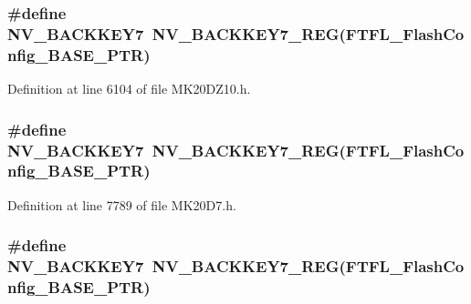 \subsubsection[{\texorpdfstring{N\+V\+\_\+\+B\+A\+C\+K\+K\+E\+Y7}{NV_BACKKEY7}}]{\setlength{\rightskip}{0pt plus 5cm}\#define N\+V\+\_\+\+B\+A\+C\+K\+K\+E\+Y7~{\bf N\+V\+\_\+\+B\+A\+C\+K\+K\+E\+Y7\+\_\+\+R\+EG}({\bf F\+T\+F\+L\+\_\+\+Flash\+Config\+\_\+\+B\+A\+S\+E\+\_\+\+P\+TR})}\hypertarget{group___n_v___register___accessor___macros_gaf4c4eb8173a514a0fe632f29e80423d4}{}\label{group___n_v___register___accessor___macros_gaf4c4eb8173a514a0fe632f29e80423d4}


Definition at line 6104 of file M\+K20\+D\+Z10.\+h.

\subsubsection[{\texorpdfstring{N\+V\+\_\+\+B\+A\+C\+K\+K\+E\+Y7}{NV_BACKKEY7}}]{\setlength{\rightskip}{0pt plus 5cm}\#define N\+V\+\_\+\+B\+A\+C\+K\+K\+E\+Y7~{\bf N\+V\+\_\+\+B\+A\+C\+K\+K\+E\+Y7\+\_\+\+R\+EG}({\bf F\+T\+F\+L\+\_\+\+Flash\+Config\+\_\+\+B\+A\+S\+E\+\_\+\+P\+TR})}\hypertarget{group___n_v___register___accessor___macros_gaf4c4eb8173a514a0fe632f29e80423d4}{}\label{group___n_v___register___accessor___macros_gaf4c4eb8173a514a0fe632f29e80423d4}


Definition at line 7789 of file M\+K20\+D7.\+h.

\subsubsection[{\texorpdfstring{N\+V\+\_\+\+B\+A\+C\+K\+K\+E\+Y7}{NV_BACKKEY7}}]{\setlength{\rightskip}{0pt plus 5cm}\#define N\+V\+\_\+\+B\+A\+C\+K\+K\+E\+Y7~{\bf N\+V\+\_\+\+B\+A\+C\+K\+K\+E\+Y7\+\_\+\+R\+EG}({\bf F\+T\+F\+L\+\_\+\+Flash\+Config\+\_\+\+B\+A\+S\+E\+\_\+\+P\+TR})}\hypertarget{group___n_v___register___accessor___macros_gaf4c4eb8173a514a0fe632f29e80423d4}{}\label{group___n_v___register___accessor___macros_gaf4c4eb8173a514a0fe632f29e80423d4}


